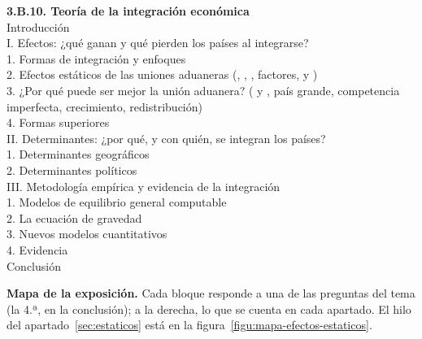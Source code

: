 \documentclass[11pt]{article}
\begin{document}
\begin{esquema}
\textbf{3.B.10. Teoría de la integración económica}\\[2pt]
Introducción\\
I. Efectos: ¿qué ganan y qué pierden los países al integrarse?\\
\hspace*{1.5em}1. Formas de integración y enfoques\\
\hspace*{1.5em}2. Efectos estáticos de las uniones aduaneras (, , , factores,  y )\\
\hspace*{1.5em}3. ¿Por qué puede ser mejor la unión aduanera? ( y , país grande, competencia imperfecta, crecimiento, redistribución)\\
\hspace*{1.5em}4. Formas superiores\\
II. Determinantes: ¿por qué, y con quién, se integran los países?\\
\hspace*{1.5em}1. Determinantes geográficos\\
\hspace*{1.5em}2. Determinantes políticos\\
III. Metodología empírica y evidencia de la integración\\
\hspace*{1.5em}1. Modelos de equilibrio general computable\\
\hspace*{1.5em}2. La ecuación de gravedad\\
\hspace*{1.5em}3. Nuevos modelos cuantitativos\\
\hspace*{1.5em}4. Evidencia\\
Conclusión
\end{esquema}

\begin{anotaciones}
\textbf{Mapa de la exposición.} Cada bloque responde a una de las preguntas del tema (la 4.ª, en la conclusión); a la derecha, lo que se cuenta en cada apartado. El hilo del apartado~\ref{sec:estaticos} está en la figura~\ref{figu:mapa-efectos-estaticos}.
\begin{infografiacaja}
\caption{Mapa del tema: la pregunta de cada bloque, sus apartados y el hilo que los une}\label{figu:mapa-tema}
\end{infografiacaja}
\end{anotaciones}
\end{document}
